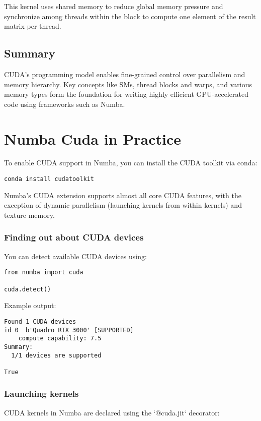 \documentclass[11pt,a4paper]{book}
\begin{document}
This kernel uses shared memory to reduce global memory pressure and synchronize among threads within the block to compute one element of the result matrix per thread.

\section*{Summary}
CUDA’s programming model enables fine-grained control over parallelism and memory hierarchy. Key concepts like SMs, thread blocks and warps, and various memory types form the foundation for writing highly efficient GPU-accelerated code using frameworks such as Numba.

\chapter{Numba Cuda in Practice}

To enable CUDA support in Numba, you can install the CUDA toolkit via conda:

\begin{lstlisting}
conda install cudatoolkit
\end{lstlisting}

Numba's CUDA extension supports almost all core CUDA features, with the exception of dynamic parallelism (launching kernels from within kernels) and texture memory.  

\subsection*{Finding out about CUDA devices}
You can detect available CUDA devices using:

\begin{lstlisting}
from numba import cuda

cuda.detect()
\end{lstlisting}

Example output:
\begin{verbatim}
Found 1 CUDA devices
id 0  b'Quadro RTX 3000' [SUPPORTED]
    compute capability: 7.5
Summary:
  1/1 devices are supported

True
\end{verbatim}

\subsection*{Launching kernels}
CUDA kernels in Numba are declared using the `@cuda.jit` decorator:
\end{document}
